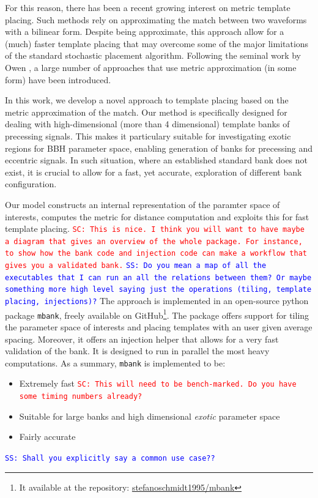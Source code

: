 \documentclass[twocolumn,showpacs,preprintnumbers,nofootinbib,prd,
superscriptaddress,10pt]{revtex4-1}
\newcommand{\stefano}[1]{{\textcolor{blue}{\texttt{SS: #1}} }}
\newcommand{\sarah}[1]{{\textcolor{red}{\texttt{SC: #1}} }}
\begin{document}
For this reason, there has been a recent growing interest on metric template placing. Such methods rely on approximating the match between two waveforms with a bilinear form. Despite being approximate, this approach allow for a (much) faster template placing that may overcome some of the major limitations of the standard stochastic placement algorithm.
Following the seminal work by Owen \cite{owen_metric}, a large number of approaches that use metric approximation (in some form) have been introduced.

In this work, we develop a novel approach to template placing based on the metric approximation of the match.
Our method is specifically designed for dealing with high-dimensional (more than 4 dimensional) template banks of precessing signals. This makes it particulary suitable for investigating exotic regions for BBH parameter space, enabling generation of banks for precessing and eccentric signals. In such situation, where an established standard bank does not exist, it is crucial to allow for a fast, yet accurate, exploration of different bank configuration.

Our model constructs an internal representation of the paramter space of interests, computes the metric for distance computation and exploits this for fast template placing. \sarah{This is nice. I think you will want to have maybe a diagram that gives an overview of the whole package. For instance, to show how the bank code and injection code can make a workflow that gives you a validated bank.} \stefano{Do you mean a map of all the executables that I can run an all the relations between them? Or maybe something more high level saying just the operations (tiling, template placing, injections)?}
The approach is implemented in an open-source python package \texttt{mbank}, freely available on GitHub\footnote{
It available at the repository: \href{https://github.com/stefanoschmidt1995/mbank}{stefanoschmidt1995/mbank}}.
The package offers support for tiling the parameter space of interests and placing templates with an user given average spacing. Moreover, it offers an injection helper that allows for a very fast validation of the bank.
It is designed to run in parallel the most heavy computations.
As a summary, \texttt{mbank} is implemented to be:
\begin{itemize}
	\item Extremely fast \sarah{This will need to be bench-marked. Do you have some timing numbers already?}
	\item Suitable for large banks and high dimensional {\it exotic} parameter space
	\item Fairly accurate
\end{itemize}
\stefano{Shall you explicitly say a common use case??}
\end{document}
